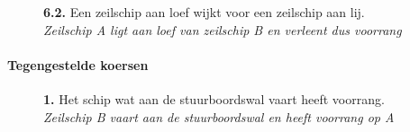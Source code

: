 \vspace{-0.7cm}
\begin{figure}[H]
	\centering
	\hspace{0.02\textwidth}
	\begin{minipage}[t]{0.70\textwidth}
		\textbf{6.2.} Een zeilschip aan loef wijkt voor een zeilschip aan lij.\\
		\textit{Zeilschip A ligt aan loef van zeilschip B en verleent dus voorrang}
	\end{minipage}
	\hfill
	\begin{minipage}[t]{0.20\textwidth}
		\label{pic:kr42}
	\end{minipage}
	\hfill
\end{figure}

\paragraph{Tegengestelde koersen}
\vspace{-0.2cm}
\begin{figure}[H]
	\centering
	\begin{minipage}[t]{0.70\textwidth}
		\textbf{1.} Het schip wat aan de stuurboordswal vaart heeft voorrang.\\
		\textit{Zeilschip B vaart aan de stuurboordswal en heeft voorrang op A}
	\end{minipage}
	\hfill
	\begin{minipage}[t]{0.25\textwidth}
		\label{pic:tg1}
	\end{minipage}
	\hfill
\end{figure}
\vspace{-0.7cm}

